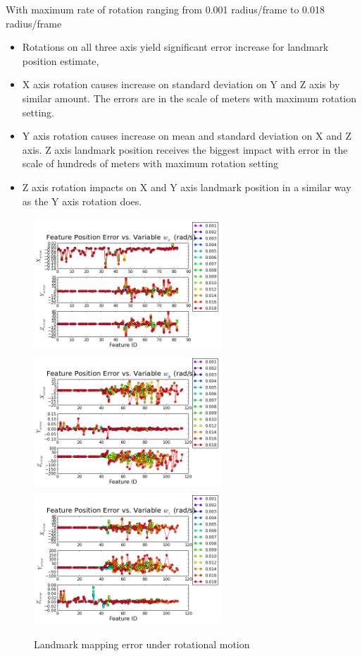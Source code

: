 With maximum rate of rotation ranging from 0.001 radius/frame to 0.018
radius/frame

\begin{itemize}
  \item Rotations on all three axis yield significant error increase for landmark position estimate,
  \item X axis rotation causes increase on standard deviation on Y and Z axis by similar amount. The errors are in the scale of meters with maximum rotation setting.
  \item Y axis rotation causes increase on mean and standard deviation on X and Z axis. Z axis landmark position receives the biggest impact with error in the scale of hundreds of meters with maximum rotation setting
  \item Z axis rotation impacts on X and Y axis landmark position in a
  similar way as the Y axis rotation does.
\end{itemize}

\begin{figure}[h]%
  \centering
  \includegraphics[width=7cm, height=5cm]{./Figures/SimulationFigures/Figure17.png}
  \includegraphics[width=7cm, height=5cm]{./Figures/SimulationFigures/Figure18.png}
  \includegraphics[width=7cm, height=5cm]{./Figures/SimulationFigures/Figure19.png}
  \caption{Landmark mapping error under rotational motion}
  \label{fig:simfig17-19}
\end{figure}

